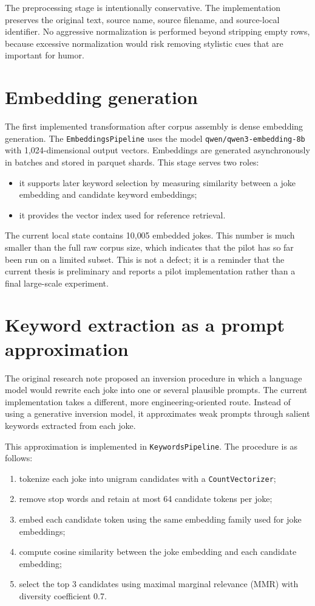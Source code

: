 \documentclass[14pt,a4paper]{extreport}
\begin{document}
The preprocessing stage is intentionally conservative. The implementation preserves the original text, source name, source filename, and source-local identifier. No aggressive normalization is performed beyond stripping empty rows, because excessive normalization would risk removing stylistic cues that are important for humor.

\section{Embedding generation}

The first implemented transformation after corpus assembly is dense embedding generation. The \texttt{EmbeddingsPipeline} uses the model \texttt{qwen/qwen3-embedding-8b} with 1{,}024-dimensional output vectors. Embeddings are generated asynchronously in batches and stored in parquet shards. This stage serves two roles:
\begin{itemize}
  \item it supports later keyword selection by measuring similarity between a joke embedding and candidate keyword embeddings;
  \item it provides the vector index used for reference retrieval.
\end{itemize}

The current local state contains 10{,}005 embedded jokes. This number is much smaller than the full raw corpus size, which indicates that the pilot has so far been run on a limited subset. This is not a defect; it is a reminder that the current thesis is preliminary and reports a pilot implementation rather than a final large-scale experiment.

\section{Keyword extraction as a prompt approximation}

The original research note proposed an inversion procedure in which a language model would rewrite each joke into one or several plausible prompts. The current implementation takes a different, more engineering-oriented route. Instead of using a generative inversion model, it approximates weak prompts through salient keywords extracted from each joke.

This approximation is implemented in \texttt{KeywordsPipeline}. The procedure is as follows:
\begin{enumerate}
  \item tokenize each joke into unigram candidates with a \texttt{CountVectorizer};
  \item remove stop words and retain at most 64 candidate tokens per joke;
  \item embed each candidate token using the same embedding family used for joke embeddings;
  \item compute cosine similarity between the joke embedding and each candidate embedding;
  \item select the top 3 candidates using maximal marginal relevance (MMR) with diversity coefficient 0.7.
\end{enumerate}
\end{document}
